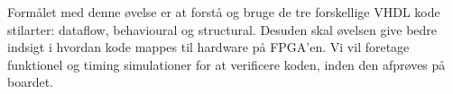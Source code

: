 Formålet med denne øvelse er at forstå og bruge de tre forskellige VHDL kode
stilarter: dataflow, behavioural og structural. Desuden skal øvelsen give bedre
indsigt i hvordan kode mappes til hardware på FPGA'en. Vi vil foretage
funktionel og timing simulationer for at verificere koden, inden den afprøves på
boardet.

